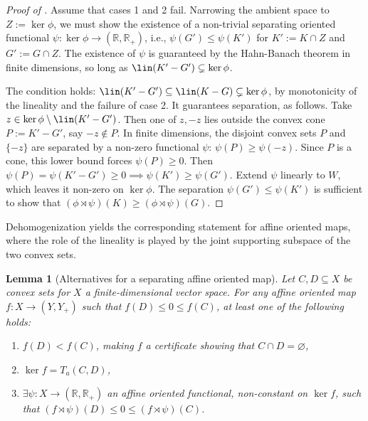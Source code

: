 \documentclass{article}
\theoremstyle{plain}
\newtheorem{lemma}[lemma]{Lemma}
\theoremstyle{definition}
\theoremstyle{remark}
\begin{document}
\begin{proof}[\hypertarget{loc:alternatives_for_a_separating_linear_oriented_map.proof}{}Proof of ]

Assume that cases 1 and 2 fail. Narrowing the ambient space to $Z := \ker\phi$, we must show the existence of a non-trivial separating oriented functional $\psi:\ker\phi \to (\mathbb{R}, \mathbb{R}_+)$, i.e., $\psi(G') \leq \psi(K')$ for $K' := K \cap Z$ and $G' := G \cap Z$. The existence of $\psi$ is guaranteed by the Hahn-Banach theorem in finite dimensions, so long as $\lin(K'-G') \subsetneq \ker\phi$.

The condition holds: $\lin(K'-G') \subseteq \lin(K-G) \subsetneq \ker\phi$, by monotonicity of the lineality and the failure of case 2. It guarantees separation, as follows. Take $z \in \ker\phi \setminus \lin(K'-G')$. Then one of $z, -z$ lies outside the convex cone $P := K' - G'$, say $-z \notin P$. In finite dimensions, the disjoint convex sets $P$ and $\{-z\}$ are separated by a non-zero functional $\psi$: $\psi(P) \geq \psi(-z)$. Since $P$ is a cone, this lower bound forces $\psi(P) \geq 0$. Then $\psi(P) = \psi(K' - G') \geq 0  \implies \psi(K') \geq \psi(G')$.
Extend $\psi$ linearly to $W$, which leaves it non-zero on $\ker\phi$. The separation $\psi(G') \leq \psi(K')$ is sufficient to show that $(\phi \rtimes \psi)(K) \geq (\phi \rtimes \psi)(G)$.
\end{proof}
Dehomogenization yields the corresponding statement for affine oriented maps, where the role of the lineality is played by the joint supporting subspace of the two convex sets.
\begin{lemma}[Alternatives for a separating affine oriented map]
\label{loc:alternatives_for_a_separating_affine_oriented_map.statement}
 Let $C, D \subseteq X$ be convex sets for $X$ a finite-dimensional
vector space. For any affine oriented map $f:X \to (Y,Y_+)$ such that
$f(D) \le 0 \le f(C)$, at least one of the following holds:
\begin{enumerate}
\item $f(D) < f(C)$,  making $f$ a certificate showing that $C \cap D = \varnothing$,
\item $\ker f = T_a(C,D)$,
\item $\exists \psi:X \to (\mathbb{R}, \mathbb{R}_+)$ an affine oriented functional, non-constant on $\ker f$, such that $(f \rtimes \psi)(D) \le 0 \le (f \rtimes \psi)(C)$.
\end{enumerate}
\end{lemma}
\end{document}
